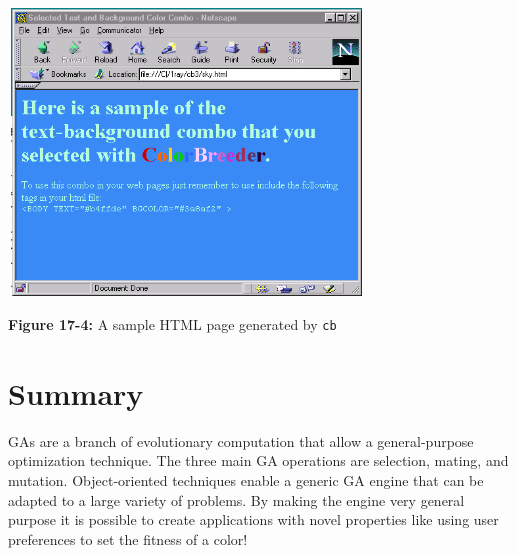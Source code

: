 \begin{center}
\includegraphics[width=3.7256in,height=3.0047in]{ub-img/ub-img49.png}
\end{center}

{\sffamily\bfseries Figure 17-4:}
{\sffamily A sample HTML page generated by \texttt{cb}}

\section*{Summary}

GAs are a branch of evolutionary computation that allow a
general-purpose optimization technique. The three main GA operations
are selection, mating, and mutation. Object-oriented techniques enable
a generic GA engine that can be adapted to a large variety of problems.
By making the engine very general purpose it is possible to create
applications with novel properties like using user preferences to set
the fitness of a color! 

